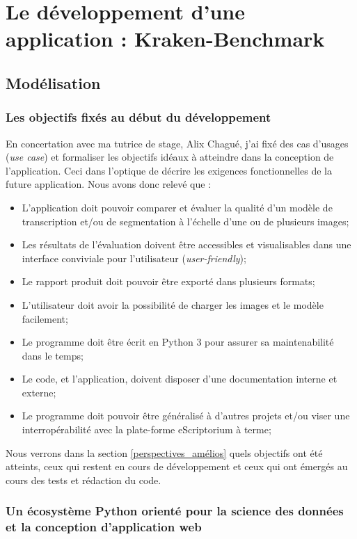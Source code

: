 \chapter{Le développement d'une application : Kraken-Benchmark}

\section{Modélisation}

\subsection{Les objectifs fixés au début du développement}\label{objectifs}
En concertation avec ma tutrice de stage, Alix Chagué, j'ai fixé des cas d'usages (\textit{use case}) et formaliser les objectifs idéaux à atteindre dans la conception de l'application. Ceci dans l'optique de  décrire les exigences fonctionnelles de la future application. Nous avons donc relevé que :

\begin{itemize}
    \item L'application doit pouvoir comparer et évaluer la qualité d'un modèle de transcription et/ou de segmentation à l'échelle d'une ou de plusieurs images;
    \item Les résultats de l'évaluation doivent être accessibles et visualisables dans une interface conviviale pour l'utilisateur (\textit{user-friendly});
    \item Le rapport produit doit pouvoir être exporté dans plusieurs formats;
    \item L'utilisateur doit avoir la possibilité de charger les images et le modèle facilement;
    \item Le programme doit être écrit en Python 3 pour assurer sa  maintenabilité dans le temps;
    \item Le code, et l'application, doivent disposer d'une documentation interne et externe;
    \item Le programme doit pouvoir être généralisé à d'autres projets et/ou viser une interropérabilité avec la plate-forme eScriptorium à terme;
\end{itemize}

Nous verrons dans la section \ref{perspectives_amélios} quels objectifs ont été atteints, ceux qui restent en cours de développement et ceux qui ont émergés au cours des tests et rédaction du code. 

\subsection{Un écosystème Python orienté pour la science des données et la conception d'application web}

